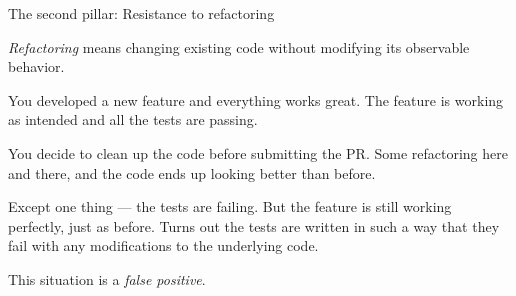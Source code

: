 \documentclass[english,handout,10pt,aspectratio=169,t]{beamer}
\begin{document}
\begin{frame}{The second pillar: Resistance to refactoring}
  \begin{minipage}{\linewidth}
    \textit{Refactoring} means changing existing code without modifying its
    observable behavior.
  \end{minipage}
  \vfill
  \begin{minipage}{\linewidth}
     You developed a new feature and everything works great. The
    feature is working as intended and all the tests are passing.

    \medskip
    
    You decide to clean up the code before submitting the PR. Some refactoring here
    and there, and the code ends up looking better than before.

    \medskip
    
    Except one thing --- the tests are failing. But the feature is still working
    perfectly, just as before. Turns out the tests are written in such a way that
    they fail with any modifications to the underlying code.

    \medskip

    This situation is a \textit{false positive}.
  \end{minipage}
  \vfill
\end{frame}
\end{document}

